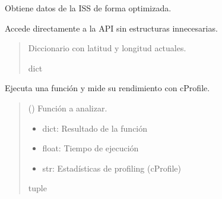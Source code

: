 \documentclass[letterpaper,10pt,spanish]{sphinxmanual}
\begin{document}
\begin{fulllineitems}
\label{\detokenize{main:main.obtener_datos_opt}}
\pysigstartsignatures
\pysiglinewithargsret
{}
{}
{}
\pysigstopsignatures
\sphinxAtStartPar
Obtiene datos de la ISS de forma optimizada.

\sphinxAtStartPar
Accede directamente a la API sin estructuras innecesarias.
\begin{quote}\begin{description}
\sphinxAtStartPar
Diccionario con latitud y longitud actuales.

\sphinxAtStartPar
dict

\end{description}\end{quote}

\end{fulllineitems}


\begin{fulllineitems}
\label{\detokenize{main:main.perfilar}}
\pysigstartsignatures
\pysiglinewithargsret
{}
{}
{}
\pysigstopsignatures
\sphinxAtStartPar
Ejecuta una función y mide su rendimiento con cProfile.
\begin{quote}\begin{description}
\sphinxAtStartPar
{} () \textendash{} Función a analizar.

\sphinxAtStartPar
\begin{itemize}
\item {} 
\sphinxAtStartPar
dict: Resultado de la función

\item {} 
\sphinxAtStartPar
float: Tiempo de ejecución

\item {} 
\sphinxAtStartPar
str: Estadísticas de profiling (cProfile)

\end{itemize}


\sphinxAtStartPar
tuple

\end{description}\end{quote}

\end{fulllineitems}



\renewcommand{\indexname}{Índice de Módulos Python}
\begin{sphinxtheindex}
\let\bigletter\sphinxstyleindexlettergroup
\bigletter{m}
\item\relax{}
\end{sphinxtheindex}

\renewcommand{\indexname}{Índice}
\printindex
\end{document}
